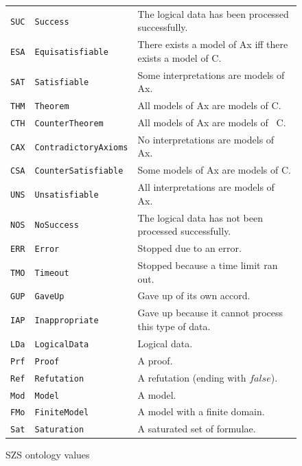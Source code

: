 \documentclass{easychair}
\begin{document}
\begin{figure}[htb]
\centering
\begin{tabular}{lll}
\hline
{\tt SUC} & {\tt Success}             & 
The logical data has been processed successfully. \\
{\tt ESA} & {\tt Equisatisfiable}     & 
There exists a model of Ax iff there exists a model of C.\\
{\tt SAT} & {\tt Satisfiable}         & 
Some interpretations are models of Ax.\\
{\tt THM} & {\tt Theorem}             & 
All models of Ax are models of C.\\
{\tt CTH} & {\tt CounterTheorem}      & 
All models of Ax are models of ~C.\\
{\tt CAX} & {\tt ContradictoryAxioms} & 
No interpretations are models of Ax.\\
{\tt CSA} & {\tt CounterSatisfiable}  & 
Some models of Ax are models of {\raisebox{0.4ex}{\texttildelow}}C.\\
{\tt UNS} & {\tt Unsatisfiable}       & 
All interpretations are models of {\raisebox{0.4ex}{\texttildelow}}Ax.\\
\hline
{\tt NOS} & {\tt NoSuccess}           & 
The logical data has not been processed successfully. \\
{\tt ERR} & {\tt Error}               & 
Stopped due to an error. \\
{\tt TMO} & {\tt Timeout}             & 
Stopped because a time limit ran out. \\
{\tt GUP} & {\tt GaveUp}              & 
Gave up of its own accord. \\
{\tt IAP} & {\tt Inappropriate}       & 
Gave up because it cannot process this type of data. \\
\hline
{\tt LDa} & {\tt LogicalData}         & 
Logical data. \\
{\tt Prf} & {\tt Proof}               & 
A proof. \\
{\tt Ref} & {\tt Refutation}          & 
A refutation (ending with $false$). \\
{\tt Mod} & {\tt Model}               & 
A model. \\
{\tt FMo} & {\tt FiniteModel}         & 
A model with a finite domain. \\
{\tt Sat} & {\tt Saturation}          & 
A saturated set of formulae. \\
\hline
\end{tabular}
\caption{SZS ontology values}
\label{SZSTable}
\end{figure} 
\end{document}
